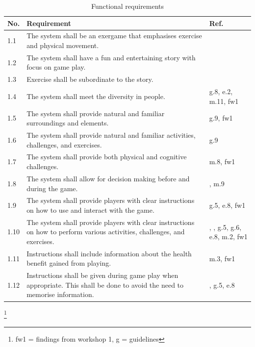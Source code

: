\begin{table} [H]
\centering
\begin{tabular}{|>{\raggedright}p{}|p{}|p{}|}
\hline
\textbf{No.} & \textbf{Requirement} &  \textbf{Ref.}\\ \hline
1.1 & The system shall be an exergame that emphasises exercise and physical movement. & \cite{project} \\ \hline
1.2 & The system shall have a fun and entertaining story with focus on game play.  & \cite{project} \cite{zyda2005visual} \\ \hline
1.3 & Exercise shall be subordinate to the story. & \cite{zyda2005visual} \\ \hline
1.4 & The system shall meet the diversity in people. & g.8, e.2, m.11, fw1 \\ \hline
1.5 & The system shall provide natural and familiar surroundings and elements. & g.9, fw1\\ \hline
1.6 & The system shall provide natural and familiar activities, challenges, and exercises. & g.9 \\ \hline
1.7 & The system shall provide both physical and cognitive challenges. & m.8, fw1 \\ \hline
1.8 & The system shall allow for decision making before and during the game. & \cite{understandingvg}, m.9 \\ \hline
1.9 & The system shall provide players with clear instructions on how to use and interact with the game. & g.5, e.8, fw1 \\ \hline
1.10 & The system shall provide players with clear instructions on how to perform various activities, challenges, and exercises. & \cite{sweetser}, \cite{project}, g.5, g.6, e.8, m.2, fw1\\ \hline
1.11 & Instructions shall include information about the health benefit gained from playing. & m.3, fw1\\ \hline
1.12 & Instructions shall be given during game play when appropriate. This shall be done to avoid the need to memorise information. & \cite{sweetser}, g.5, e.8 \\ \hline
    \end{tabular}
    \caption[Functional requirements, part 1]{Functional requirements}
    \label{tab:func1}
\end{table} 
\footnote{fw1 = findings from workshop 1, g = guidelines}

